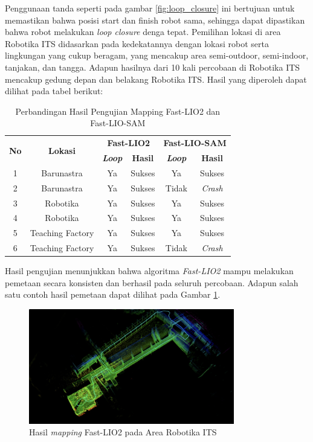 Penggunaan tanda seperti pada gambar \ref{fig:loop_closure} ini bertujuan untuk memastikan bahwa posisi start dan finish robot
sama, sehingga dapat dipastikan bahwa robot melakukan \emph{loop closure} denga tepat. Pemilihan lokasi di area Robotika ITS didasarkan pada kedekatannya dengan lokasi robot serta lingkungan yang cukup beragam, yang mencakup area semi-outdoor, semi-indoor, tanjakan, dan tangga. Adapun hasilnya dari 10 kali percobaan di Robotika
ITS mencakup gedung depan dan belakang Robotika ITS. Hasil yang diperoleh dapat dilihat pada tabel berikut:

\begin{table}[H]
	\centering
	\caption{Perbandingan Hasil Pengujian Mapping Fast-LIO2 dan Fast-LIO-SAM}
	\label{tab:perbandingan_mapping}
	\begin{tabular}{|c|c|c|c|c|c|}
	  \hline
	  \multirow{2}{*}{\textbf{No}} & \multirow{2}{*}{\textbf{Lokasi}} & \multicolumn{2}{c|}{\textbf{Fast-LIO2}} & \multicolumn{2}{c|}{\textbf{Fast-LIO-SAM}} \\
	  \cline{3-6}
	  & & \textbf{\emph{Loop}} & \textbf{Hasil} & \textbf{\emph{Loop}} & \textbf{Hasil} \\
	  \hline
	  1 & Barunastra       & Ya    & Sukses & Ya     & Sukses       \\
	  2 & Barunastra       & Ya    & Sukses & Tidak  & \emph{Crash} \\
	  3 & Robotika         & Ya    & Sukses & Ya     & Sukses       \\
	  4 & Robotika         & Ya    & Sukses & Ya     & Sukses       \\
	  5 & Teaching Factory & Ya    & Sukses & Ya     & Sukses       \\
	  6 & Teaching Factory & Ya    & Sukses & Tidak  & \emph{Crash} \\
	  \hline
	\end{tabular}
  \end{table}
  
Hasil pengujian menunjukkan bahwa algoritma \emph{Fast-LIO2} mampu melakukan pemetaan secara konsisten dan berhasil pada seluruh percobaan. Adapun salah satu contoh hasil pemetaan dapat dilihat pada Gambar \ref{fig:hasil_mapping_fastlio2}.
\begin{figure}[H]
	\centering
	\includegraphics[width=0.8\textwidth]{gambar/bab3/loop-closure.png}
	\caption{Hasil \emph{mapping} Fast-LIO2 pada Area Robotika ITS}
	\label{fig:hasil_mapping_fastlio2}
\end{figure}

